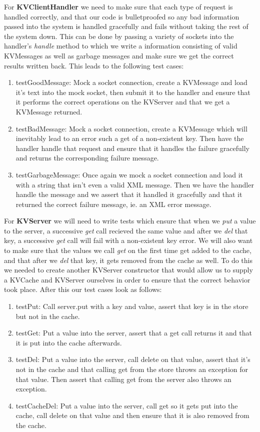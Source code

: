 \documentclass{article}
\begin{document}
For \textbf{KVClientHandler} we need to make sure that each type of request is handled correctly, and that our code is
bulletproofed so any bad information passed into the system is handled gracefully and fails without taking the rest of
the system down. This can be done by passing a variety of sockets into the handler's \textit{handle} method to which we
write a information consisting of valid KVMessages as well as garbage messages and make sure we get the correct results
written back. This leads to the following test cases:
\begin{enumerate}
\item testGoodMessage: Mock a socket connection, create a KVMessage and load it's text into the mock socket, then submit
it to the handler and ensure that it performs the correct operations on the KVServer and that we get a KVMessage
returned.
\item testBadMessage: Mock a socket connection, create a KVMessage which will inevitably lead to an error such a get of
a non-existent key. Then have the handler handle that request and ensure that it handles the failure gracefully and
returns the corresponding failure message.
\item testGarbageMessage: Once again we mock a socket connection and load it with a string that isn't even a valid XML
message. Then we have the handler handle the message and we assert that it handled it gracefully and that it returned
the correct failure message, ie. an XML error message.
\end{enumerate}

For \textbf{KVServer} we will need to write tests which ensure that when we \textit{put} a value to the server, a successive
\textit{get} call recieved the same value and after we \textit{del} that key, a successive \textit{get} call will fail
with a non-existent key error. We will also want to make sure that the values we call \textit{get} on the first time get
added to the cache, and that after we \textit{del} that key, it gets removed from the cache as well. To do this we
needed to create another KVServer constructor that would allow us to supply a KVCache and KVServer ourselves in order
to ensure that the correct behavior took place. After this our test cases look as follows:
\begin{enumerate}
\item testPut: Call server.put with a key and value, assert that key is in the store but not in the cache.
\item testGet: Put a value into the server, assert that a get call returns it and that it is put into the cache
afterwards.
\item testDel: Put a value into the server, call delete on that value, assert that it's not in the cache and that
calling get from the store throws an exception for that value. Then assert that calling get from the server also throws
an exception.
\item testCacheDel: Put a value into the server, call get so it gets put into the cache, call delete on that value and
then ensure that it is also removed from the cache.
\end{enumerate}
\end{document}
